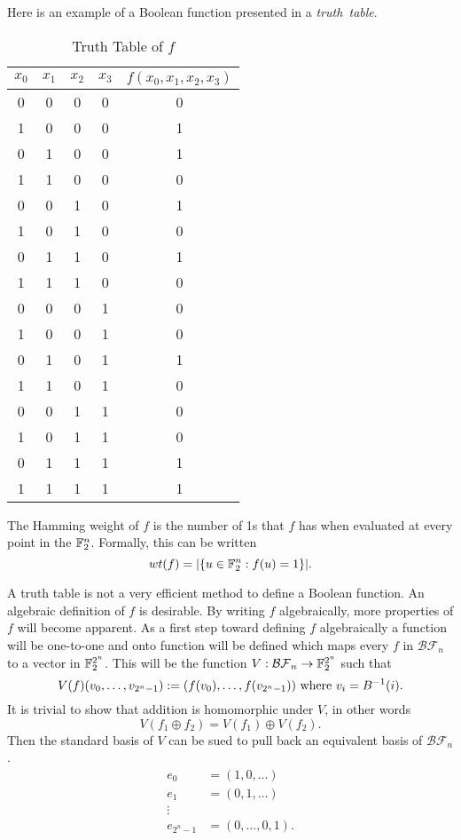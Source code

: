 \par Here is an example of a Boolean function presented in a {\em truth\ table}.
\begin{table}
\label{tab:truth-table}
	\centering
  \begin{tabular}{|c|c|c|c|c|}
    \hline
    $x_0$&$x_1$&$x_2$&$x_3$&$f(x_0,x_1,x_2,x_3)$\\
    \hline
    0&0&0&0&0\\
    1&0&0&0&1\\
    0&1&0&0&1\\
    1&1&0&0&0\\
    0&0&1&0&1\\
    1&0&1&0&0\\
    0&1&1&0&1\\
    1&1&1&0&0\\
    0&0&0&1&0\\
    1&0&0&1&0\\
    0&1&0&1&1\\
    1&1&0&1&0\\
    0&0&1&1&0\\
    1&0&1&1&0\\
    0&1&1&1&1\\
    1&1&1&1&1\\
  	\hline
	\end{tabular}
	\caption{Truth Table of $f$}
\end{table}
\par The Hamming weight of $f$ is the number of 1s that $f$ has when evaluated
at every point in the $\mathbb{F}_2^n$. Formally, this can be written
\[
wt(f)=\lvert\{u\in\mathbb{F}_2^n:f(u)=1\}\rvert.
\]
\par A truth table is not a very efficient method to define a Boolean function.
An algebraic definition of $f$ is desirable. By writing $f$ algebraically, more
properties of $f$ will become apparent. As a first step toward defining $f$
algebraically a function will be one-to-one and onto function will be defined
which maps every $f$ in $\mathcal{BF}_n$ to a vector in $\mathbb{F}_2^{2^n}$. This
will be the function $V:\mathcal{BF}_n\rightarrow\mathbb{F}_2^{2^n}$ such that
\begin{equation}\label{eqn:bool-vector}
	V(f)(v_0,\dots,v_{2^n-1}):=(f(v_0),\dots,f(v_{2^n-1}))\ {\rm where\ } v_i=B^{-1}(i).
\end{equation}
It is trivial to show that addition is homomorphic under $V$, in other words
\[
V(f_1\oplus f_2)=V(f_1)\oplus V(f_2).
\]
Then the standard basis of $V$ can be sued to pull back an equivalent basis of
$\mathcal{BF}_n$.
\begin{align*}
	e_0&=(1,0,\dots)\\
	e_1&=(0,1,\dots)\\
	\vdots \\
	e_{2^n-1}&=(0,\dots,0,1).
\end{align*}

